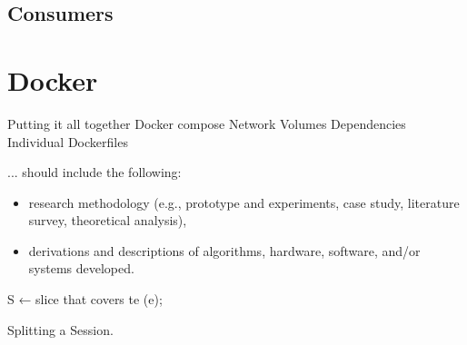 \subsection{Consumers}

\section{Docker}
Putting it all together
Docker compose 
Network 
Volumes
Dependencies
Individual Dockerfiles

... should include the following:
\begin{itemize}
\item research methodology (e.g., prototype and experiments, case study, literature survey, theoretical analysis),
\item derivations and descriptions of algorithms, hardware, software, and/or systems developed.
\end{itemize}
\begin{comment} 
\begin{algorithm}
\SetAlgoLined
\KwResult{Write here the result }
 initialization\;
 \While{While condition}{
  instructions\;
  \eIf{condition}{
    instructions1\;
    instructions2\;
    }{
    instructions3\;
    }
    }
 \caption{An Example Algorithm}
\end{algorithm}
\end{comment} 


\begin{algorithm}
\SetAlgoLined
{}
 S ← slice that covers te (e);\\
 \caption{Splitting a Session\cite{TraubGCBKRM20}.}
\end{algorithm}